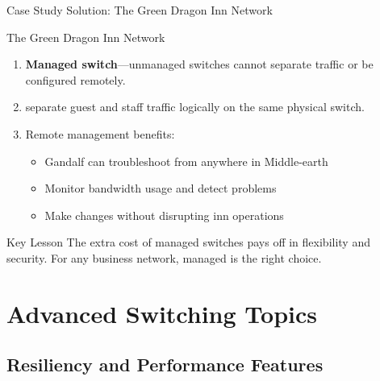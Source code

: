 \documentclass[aspectratio=169]{beamer}  %
\begin{document}
\begin{frame}{Case Study Solution: The Green Dragon Inn Network}
    \begin{casesolution}{The Green Dragon Inn Network}
        \begin{enumerate}
            \item \textbf{Managed switch}---unmanaged switches cannot separate traffic or be configured remotely.
            \item {} separate guest and staff traffic logically on the same physical switch.
            \item Remote management benefits:
                \begin{itemize}
                    \item Gandalf can troubleshoot from anywhere in Middle-earth
                    \item Monitor bandwidth usage and detect problems
                    \item Make changes without disrupting inn operations
                \end{itemize}
        \end{enumerate}
    \end{casesolution}
    
    \vspace{0.3em}
    \begin{alertblock}{Key Lesson}
        The extra cost of managed switches pays off in flexibility and security. For any business network, managed is the right choice.
    \end{alertblock}
\end{frame}

\section{Advanced Switching Topics}
\subsection{Resiliency and Performance Features}
\end{document}
